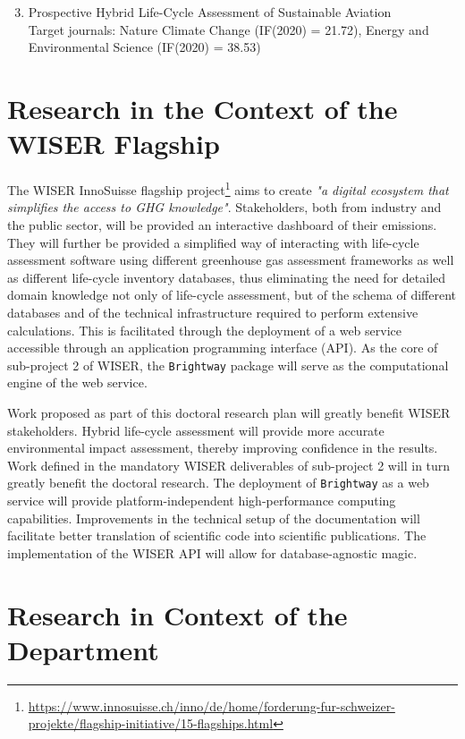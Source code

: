 \documentclass{article}
\begin{document}
    \begin{enumerate}
    \setcounter{enumi}{2}
        \item Prospective Hybrid Life-Cycle Assessment of Sustainable Aviation \\ Target journals: Nature Climate Change (IF(2020) = 21.72), Energy and Environmental Science (IF(2020) = 38.53)
    \end{enumerate}
    
\section{Research in the Context of the WISER Flagship}
    
    The WISER InnoSuisse flagship project\footnote{\url{https://www.innosuisse.ch/inno/de/home/forderung-fur-schweizer-projekte/flagship-initiative/15-flagships.html}} aims to create \textit{"a digital ecosystem that simplifies the access to GHG knowledge"}. Stakeholders, both from industry and the public sector, will be provided an interactive dashboard of their emissions. They will further be provided a simplified way of interacting with life-cycle assessment software using different greenhouse gas assessment frameworks as well as different life-cycle inventory databases, thus eliminating the need for detailed domain knowledge not only of life-cycle assessment, but of the schema of different databases and of the technical infrastructure required to perform extensive calculations. This is facilitated through the deployment of a web service accessible through an application programming interface (API). As the core of sub-project 2 of WISER, the \texttt{Brightway} package will serve as the computational engine of the web service.
    
    Work proposed as part of this doctoral research plan will greatly benefit WISER stakeholders. Hybrid life-cycle assessment will provide more accurate environmental impact assessment, thereby improving confidence in the results. Work defined in the mandatory WISER deliverables of sub-project 2 will in turn greatly benefit the doctoral research. The deployment of \texttt{Brightway} as a web service will provide platform-independent high-performance computing capabilities. Improvements in the technical setup of the documentation will facilitate better translation of scientific code into scientific publications. The implementation of the WISER API will allow for database-agnostic magic.
    
\section{Research in Context of the Department}
\end{document}

